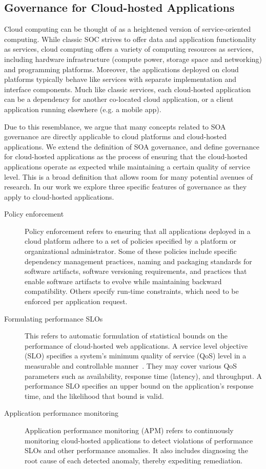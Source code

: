 \subsection{Governance for Cloud-hosted Applications}
Cloud computing can be thought of as a heightened version of service-oriented computing. While classic
SOC strives to offer data and application functionality as services, cloud computing offers a variety
of computing resources
as services, including hardware infrastructure (compute power, storage space and networking) and programming
platforms. Moreover, the applications deployed on cloud platforms typically behave like services with
separate implementation and interface components. 
Much like classic services, each cloud-hosted application 
can be a dependency for another
co-located cloud application, or a client application running elsewhere (e.g. a mobile app). 

Due to this resemblance, we argue that many concepts related to SOA governance are
directly applicable to cloud platforms and cloud-hosted applications. 
We extend the definition of SOA governance, and define governance for cloud-hosted applications
as the process of ensuring that the cloud-hosted applications
operate as expected while maintaining a certain quality of service level.
This is a broad definition that allows room for many potential avenues of research.
In our work we explore three specific features of governance as they apply to cloud-hosted applications.

\begin{description}
\item [Policy enforcement]
Policy enforcement refers to ensuring that all applications deployed in a cloud platform
adhere to a set of policies specified by a platform or organizational administrator.
Some of these policies include specific
dependency management practices, naming and packaging standards for software artifacts, 
software versioning requirements, and practices that enable software artifacts to evolve 
while maintaining backward compatibility.
Others specify run-time constraints, which need to be enforced per application request.

\item [Formulating performance SLOs]
This refers to automatic formulation of statistical bounds on the 
performance of cloud-hosted web applications.
A service level objective (SLO) specifies a system's minimum quality of service (QoS) level in a measurable and
controllable manner~\cite{smj2000}. They may cover various QoS
parameters such as availability, response time (latency), and throughput. A performance SLO
specifies an upper bound on the application's response time, and the likelihood that bound is valid.

\item [Application performance monitoring]
Application performance monitoring (APM) refers to continuously monitoring cloud-hosted applications
to detect violations of performance SLOs and other performance anomalies. 
It also includes diagnosing the root cause of each detected anomaly, thereby expediting
remediation.
\end{description}

